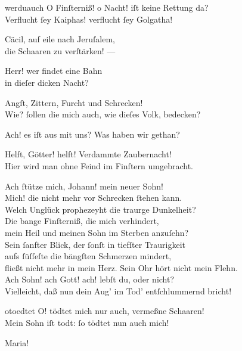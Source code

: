 \documentclass[shorttitlesize=50,tocstyle=ref-genre]{ees}
\begin{document}
{\begin{movement}{werduauch}
    O Finſterniß! o Nacht! iſt keine Rettung da?\\
    Verflucht ſey Kaiphas! verflucht ſey Golgatha!

    Cäcil, auf eile nach Jeruſalem,\\
    die Schaaren zu verſtärken! —

    \hspace*{3cm}Herr! wer findet eine Bahn\\
    in dieſer dicken Nacht?

    \hspace*{3cm}Angſt, Zittern, Furcht und Schrecken!\\
    Wie? ſollen die mich auch, wie dieſes Volk, bedecken?

    Ach! es iſt aus mit uns? Was haben wir gethan?

    Helft, Götter! helft! Verdammte Zaubernacht!\\
    Hier wird man ohne Feind im Finſtern umgebracht.

    \voice[Maria]
    Ach ſtütze mich, Johann! mein neuer Sohn!\\
    Mich! die nicht mehr vor Schrecken ſtehen kann.\\
    Welch Unglück prophezeyht die traurge Dunkelheit?\\
    Die bange Finſterniß, die mich verhindert,\\
    mein Heil und meinen Sohn im Sterben anzuſehn?\\
    Sein ſanfter Blick, der ſonſt in tiefſter Traurigkeit\\
    aufs ſüſſeſte die bängſten Schmerzen mindert,\\
    fließt nicht mehr in mein Herz. Sein Ohr hört nicht mein Flehn.\\
    Ach Sohn! ach Gott! ach! lebſt du, oder nicht?\\
    Vielleicht, daß nun dein Aug’ im Tod’ entſchlummernd bricht!
  \end{movement}

  \begin{movement}{otoedtet}
    \voice[Maria]
    O! tödtet mich nur auch, vermeßne Schaaren!\\
    Mein Sohn iſt todt: ſo tödtet nun auch mich!

    \voice[Jeſus]
    Maria!


\end{movement}}
\end{document}
